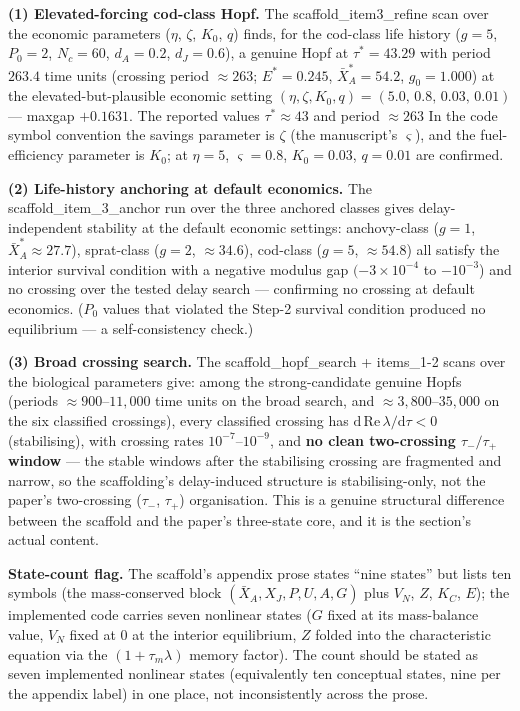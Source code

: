 \documentclass[11pt]{article}
\begin{document}
\textbf{(1) Elevated-forcing cod-class Hopf.} The
scaffold\_item3\_refine scan over the economic parameters (\(\eta\),
\(\zeta\), \(K_0\), \(q\)) finds, for the cod-class life history
(\(g = 5\), \(P_0 = 2\), \(N_c = 60\), \(d_A = 0.2\), \(d_J = 0.6\)), a
genuine Hopf at \(\tau^* = 43.29\) with period \(263.4\) time units
(crossing period \(\approx 263\); \(E^* = 0.245\),
\(\bar X_A^* = 54.2\), \(g_0 = 1.000\)) at the elevated-but-plausible
economic setting
\((\eta, \zeta, K_0, q) = (5.0,\, 0.8,\, 0.03,\, 0.01)\) --- maxgap
\(+0.1631\). The reported values \(\tau^* \approx 43\) and period
\(\approx 263\) In the code symbol convention the savings parameter is
\(\zeta\) (the manuscript's \(\varsigma\)), and the fuel-efficiency
parameter is \(K_0\); at \(\eta = 5\), \(\varsigma = 0.8\),
\(K_0 = 0.03\), \(q = 0.01\) are confirmed.

\textbf{(2) Life-history anchoring at default economics.} The
scaffold\_item\_3\_anchor run over the three anchored classes gives
delay-independent stability at the default economic settings:
anchovy-class (\(g = 1\), \(\bar X_A^* \approx 27.7\)), sprat-class
(\(g = 2\), \(\approx 34.6\)), cod-class (\(g = 5\), \(\approx 54.8\))
all satisfy the interior survival condition with a negative modulus gap
\((-3\times10^{-4}\) to \(-10^{-3}\)) and no crossing over the tested
delay search --- confirming no crossing at default economics. (\(P_0\)
values that violated the Step-2 survival condition produced no
equilibrium --- a self-consistency check.)

\textbf{(3) Broad crossing search.} The scaffold\_hopf\_search +
items\_1-2 scans over the biological parameters give: among the
strong-candidate genuine Hopfs (periods \(\approx 900\)--\(11{,}000\)
time units on the broad search, and \(\approx 3{,}800\)--\(35{,}000\) on
the six classified crossings), every classified crossing has
\(\mathrm{d\,Re}\,\lambda/\mathrm{d}\tau < 0\) (stabilising), with
crossing rates \(10^{-7}\)--\(10^{-9}\), and \textbf{no clean
two-crossing \(\tau_-/\tau_+\) window} --- the stable windows after the
stabilising crossing are fragmented and narrow, so the scaffolding's
delay-induced structure is stabilising-only, not the paper's
two-crossing (\(\tau_-\), \(\tau_+\)) organisation. This is a genuine
structural difference between the scaffold and the paper's three-state
core, and it is the section's actual content.

\textbf{State-count flag.} The scaffold's appendix prose states ``nine
states'' but lists ten symbols (the mass-conserved block
\((\bar X_A, X_J, P, U, A, G)\) plus \(V_N\), \(Z\), \(K_C\), \(E\));
the implemented code carries seven nonlinear states (\(G\) fixed at its
mass-balance value, \(V_N\) fixed at \(0\) at the interior equilibrium,
\(Z\) folded into the characteristic equation via the
\((1+\tau_m\lambda)\) memory factor). The count should be stated as
seven implemented nonlinear states (equivalently ten conceptual states,
nine per the appendix label) in one place, not inconsistently across the
prose.
\end{document}
